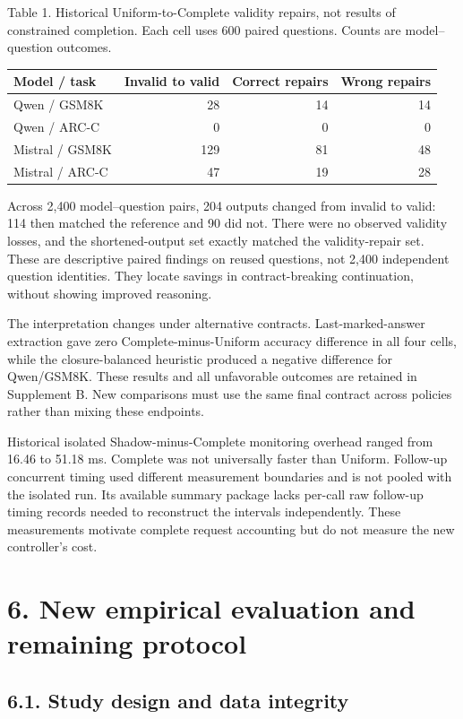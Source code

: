 \documentclass[
  12pt,
  a4paper,
]{article}
\begin{document}
Table 1. Historical Uniform-to-Complete validity repairs, not results of
constrained completion. Each cell uses 600 paired questions. Counts are
model--question outcomes.

\begin{longtable}[]{@{}lrrr@{}}
\toprule\noalign{}
Model / task & Invalid to valid & Correct repairs & Wrong repairs \\
\midrule\noalign{}
\endhead
\bottomrule\noalign{}
\endlastfoot
Qwen / GSM8K & 28 & 14 & 14 \\
Qwen / ARC-C & 0 & 0 & 0 \\
Mistral / GSM8K & 129 & 81 & 48 \\
Mistral / ARC-C & 47 & 19 & 28 \\
\end{longtable}

Across 2,400 model--question pairs, 204 outputs changed from invalid to
valid: 114 then matched the reference and 90 did not. There were no
observed validity losses, and the shortened-output set exactly matched
the validity-repair set. These are descriptive paired findings on reused
questions, not 2,400 independent question identities. They locate
savings in contract-breaking continuation, without showing improved
reasoning.

The interpretation changes under alternative contracts.
Last-marked-answer extraction gave zero Complete-minus-Uniform accuracy
difference in all four cells, while the closure-balanced heuristic
produced a negative difference for Qwen/GSM8K. These results and all
unfavorable outcomes are retained in Supplement B. New comparisons must
use the same final contract across policies rather than mixing these
endpoints.

Historical isolated Shadow-minus-Complete monitoring overhead ranged
from 16.46 to 51.18 ms. Complete was not universally faster than
Uniform. Follow-up concurrent timing used different measurement
boundaries and is not pooled with the isolated run. Its available
summary package lacks per-call raw follow-up timing records needed to
reconstruct the intervals independently. These measurements motivate
complete request accounting but do not measure the new controller's
cost.

\section{6. New empirical evaluation and remaining protocol}

\subsection{6.1. Study design and data integrity}
\end{document}

